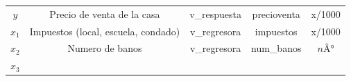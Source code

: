 \documentclass[
]{article}
\begin{document}
\begin{longtable}[]{@{}ccccc@{}}
\begin{minipage}[t]{0.13\columnwidth}
\(y\)\strut
\end{minipage} & \begin{minipage}[t]{0.21\columnwidth}\centering
Precio de venta de la casa\strut
\end{minipage} & \begin{minipage}[t]{0.22\columnwidth}\centering
v\_respuesta\strut
\end{minipage} & \begin{minipage}[t]{0.23\columnwidth}\centering
precioventa\strut
\end{minipage} & \begin{minipage}[t]{0.06\columnwidth}\centering
x/1000\strut
\end{minipage}\tabularnewline
\begin{minipage}[t]{0.13\columnwidth}\centering
\(x_1\)\strut
\end{minipage} & \begin{minipage}[t]{0.21\columnwidth}\centering
Impuestos (local, escuela, condado)\strut
\end{minipage} & \begin{minipage}[t]{0.22\columnwidth}\centering
v\_regresora\strut
\end{minipage} & \begin{minipage}[t]{0.23\columnwidth}\centering
impuestos\strut
\end{minipage} & \begin{minipage}[t]{0.06\columnwidth}\centering
x/1000\strut
\end{minipage}\tabularnewline
\begin{minipage}[t]{0.13\columnwidth}\centering
\(x_2\)\strut
\end{minipage} & \begin{minipage}[t]{0.21\columnwidth}\centering
Numero de banos\strut
\end{minipage} & \begin{minipage}[t]{0.22\columnwidth}\centering
v\_regresora\strut
\end{minipage} & \begin{minipage}[t]{0.23\columnwidth}\centering
num\_banos\strut
\end{minipage} & \begin{minipage}[t]{0.06\columnwidth}\centering
\(nÂ°\)\strut
\end{minipage}\tabularnewline
\begin{minipage}[t]{0.13\columnwidth}\centering
\(x_3\)\strut
\end{minipage} & \begin{minipage}[t]{0.21\columnwidth}\centering

\end{minipage}
\end{longtable}
\end{document}

